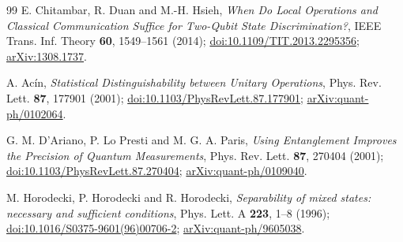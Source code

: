 \documentclass[11pt,a4paper]{article}
\theoremstyle{definition}
\theoremstyle{plain}
\begin{document}
\begin{thebibliography}{99}
E. Chitambar, R. Duan and M.-H. Hsieh,
\emph{When Do Local Operations and Classical Communication Suffice for
Two-Qubit State Discrimination?},
IEEE Trans. Inf. Theory \textbf{60}, 1549--1561 (2014);
\href{https://doi.org/10.1109/TIT.2013.2295356}{doi:10.1109/TIT.2013.2295356};
\href{https://arxiv.org/abs/1308.1737}{arXiv:1308.1737}.

A. Ac\'in, \emph{Statistical Distinguishability between Unitary Operations},
Phys. Rev. Lett. \textbf{87}, 177901 (2001);
\href{https://doi.org/10.1103/PhysRevLett.87.177901}{doi:10.1103/PhysRevLett.87.177901};
\href{https://arxiv.org/abs/quant-ph/0102064}{arXiv:quant-ph/0102064}.

G. M. D'Ariano, P. Lo Presti and M. G. A. Paris,
\emph{Using Entanglement Improves the Precision of Quantum Measurements},
Phys. Rev. Lett. \textbf{87}, 270404 (2001);
\href{https://doi.org/10.1103/PhysRevLett.87.270404}{doi:10.1103/PhysRevLett.87.270404};
\href{https://arxiv.org/abs/quant-ph/0109040}{arXiv:quant-ph/0109040}.

M. Horodecki, P. Horodecki and R. Horodecki,
\emph{Separability of mixed states: necessary and sufficient conditions},
Phys. Lett. A \textbf{223}, 1--8 (1996);
\href{https://doi.org/10.1016/S0375-9601(96)00706-2}{doi:10.1016/S0375-9601(96)00706-2};
\href{https://arxiv.org/abs/quant-ph/9605038}{arXiv:quant-ph/9605038}.
\end{thebibliography}
\endgroup
\end{document}
